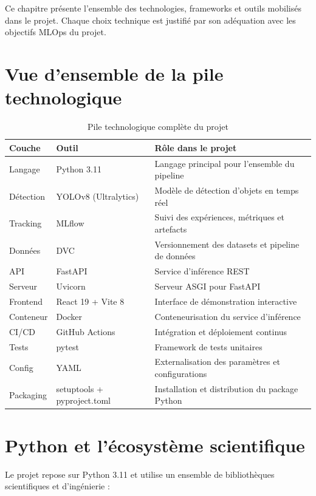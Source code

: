 \documentclass[a4paper,12pt]{report}
\begin{document}
Ce chapitre pr\'esente l'ensemble des technologies, frameworks et outils mobilis\'es dans le projet. Chaque choix technique est justifi\'e par son ad\'equation avec les objectifs MLOps du projet.

\section{Vue d'ensemble de la pile technologique}

\begin{table}[H]
\centering
\caption{Pile technologique compl\`ete du projet}
\begin{tabularx}{\textwidth}{l l X}
\toprule
\textbf{Couche} & \textbf{Outil} & \textbf{R\^ole dans le projet} \\
\midrule
Langage & Python 3.11 & Langage principal pour l'ensemble du pipeline \\
D\'etection & YOLOv8 (Ultralytics) & Mod\`ele de d\'etection d'objets en temps r\'eel \\
Tracking & MLflow & Suivi des exp\'eriences, m\'etriques et artefacts \\
Donn\'ees & DVC & Versionnement des datasets et pipeline de donn\'ees \\
API & FastAPI & Service d'inf\'erence REST \\
Serveur & Uvicorn & Serveur ASGI pour FastAPI \\
Frontend & React 19 + Vite 8 & Interface de d\'emonstration interactive \\
Conteneur & Docker & Conteneurisation du service d'inf\'erence \\
CI/CD & GitHub Actions & Int\'egration et d\'eploiement continus \\
Tests & pytest & Framework de tests unitaires \\
Config & YAML & Externalisation des param\`etres et configurations \\
Packaging & setuptools + pyproject.toml & Installation et distribution du package Python \\
\bottomrule
\end{tabularx}
\end{table}

\section{Python et l'\'ecosyst\`eme scientifique}
Le projet repose sur Python 3.11 et utilise un ensemble de biblioth\`eques scientifiques et d'ing\'enierie :
\end{document}
